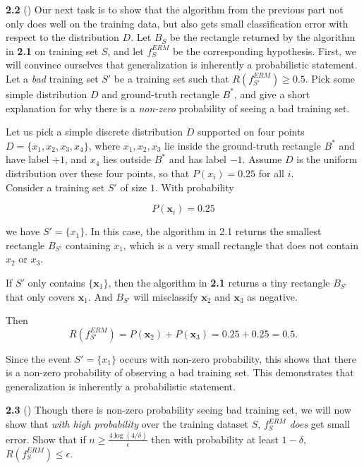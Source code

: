 \textbf{2.2} () Our next task is to show that the algorithm from the previous part not only does well on the training data, but also gets small classification error with respect to the distribution $D$.  Let $B_S$ be the rectangle returned by the algorithm in \textbf{2.1} on training set $S$, and let $f_S^{ERM}$ be the corresponding hypothesis. First, we will convince ourselves that generalization is inherently a probabilistic statement. Let a \emph{bad} training set $S'$ be a training set such that $R(f_{S'}^{ERM})\ge 0.5$. Pick some simple distribution $D$ and ground-truth rectangle $B^*$, and give a short explanation for why there is a \emph{non-zero} probability of seeing a bad training set.\\


Let us pick a simple discrete distribution $D$ supported on four points
$D = \{x_1, x_2, x_3, x_4\}$, where $x_1, x_2, x_3$ lie inside the ground-truth
rectangle $B^*$ and have label $+1$, and $x_4$ lies outside $B^*$ and has label $-1$.
Assume $D$ is the uniform distribution over these four points, so that
$P(x_i)=0.25$ for all $i$.\\

Consider a training set $S'$ of size $1$. With probability 

\[
P(\mathbf{x}_i) = 0.25
\] 

we have
$S' = \{x_1\}$. In this case, the algorithm in 2.1 returns the smallest rectangle
$B_{S'}$ containing $x_1$, which is a very small rectangle that does not contain
$x_2$ or $x_3$.

If $S'$ only contains $\{\mathbf{x}_1\}$, then the algorithm in \textbf{2.1} returns a tiny rectangle $B_{S'}$ that only covers $\mathbf{x}_1$. And $B_{S'}$ will misclassify $\mathbf{x}_2$ and $\mathbf{x}_3$ as negative.

Then
\[
R(f_{S'}^{ERM}) = P(\mathbf{x}_2) + P(\mathbf{x}_3) = 0.25 + 0.25 = 0.5.
\]

Since the event $S' = \{x_1\}$ occurs with non-zero probability, this shows that
there is a non-zero probability of observing a bad training set. This demonstrates
that generalization is inherently a probabilistic statement.
\bigskip

\textbf{2.3} ()  Though there is non-zero probability seeing bad training set, we will now show that \emph{with high probability} over the training dataset $S$, $f_S^{ERM}$ \emph{does} get small error. Show that if $n\ge \frac{4 \log (4/\delta)}{\epsilon}$ then with probability at least $1-\delta$, $R(f_S^{ERM})\le \epsilon$.
    
